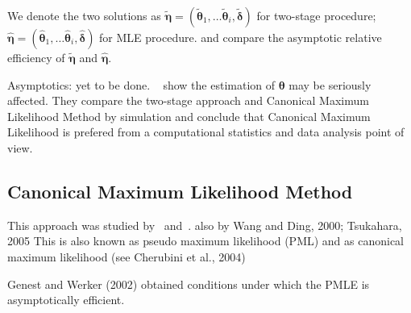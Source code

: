 We denote the two solutions as
$\tilde{\pmb{\eta}} = (\pmb{\tilde{\theta}}_1,\dots \pmb{\tilde{\theta}}_i, \pmb{\tilde{\delta}})$ for two-stage procedure;
$\hat{\pmb{\eta}} =(\pmb{\hat{\theta}}_1,\dots \pmb{\hat{\theta}}_i, \pmb{\hat{\delta}})$ for MLE procedure.
and compare the asymptotic relative efficiency of $\tilde{\pmb{\eta}}$ and $\hat{\pmb{\eta}}$.

Asymptotics: yet to be done.
~\cite{kim2007comparison} show the estimation of $\pmb{\theta}$ may be seriously affected.
They compare the two-stage approach and Canonical Maximum Likelihood Method by simulation and
conclude that Canonical Maximum Likelihood is prefered from a computational statistics and data analysis point of view.

\subsection{Canonical Maximum Likelihood Method}\label{subsec:canonical-maximum-likelihood-method}
This approach was studied by~\cite{genest1995semiparametric} and~\cite{shih1995inferences}.
also by Wang and Ding, 2000; Tsukahara, 2005
This is also known as pseudo maximum likelihood (PML) and as canonical maximum likelihood (see Cherubini et al., 2004)

Genest and Werker (2002) obtained conditions under which the PMLE is asymptotically efficient.


